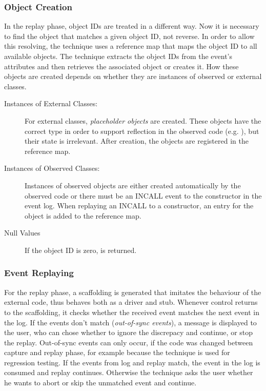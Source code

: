 \subsubsection{Object Creation}
In the replay phase, object IDs are treated in a different way. Now it is necessary to find the object that matches a given object ID, not reverse. In order to allow this resolving, the technique uses a reference map that maps the object ID to all available  objects. The technique extracts the object IDs from the event's attributes and then retrieves the associated object or creates it. How these objects are created depends on whether they are instances of observed or external classes.
\begin{description}
 \item [Instances of External Classes:] For external classes, \emph{placeholder objects} are created. These objects have the correct type in order to support reflection in the observed code (e.g. ), but their state is irrelevant. After creation, the objects are registered in the reference map.
 \item [Instances of Observed Classes:] Instances of observed objects are either created automatically by the observed code or there must be an INCALL event to the constructor in the event log. When replaying an INCALL to a constructor, an entry for the object is added to the reference map.
 \item [Null Values] If the object ID is zero,  is returned.
\end{description}

\subsubsection{Event Replaying}
For the replay phase, a scaffolding is generated that imitates the behaviour of the external code, thus behaves both as a driver and stub. Whenever control returns to the scaffolding, it checks whether the received event matches the next event in the log. If the events don't match (\emph{out-of-sync events}), a message is displayed to the user, who can chose whether to ignore the discrepacy and continue, or stop the replay.  Out-of-sync events can only occur, if the code was changed between capture and replay phase, for example because the technique is used for regression testing. If the events from log and replay match, the event in the log is  consumed and replay continues. Otherwise the technique asks the user whether he wants to abort or skip the unmatched event and continue.

